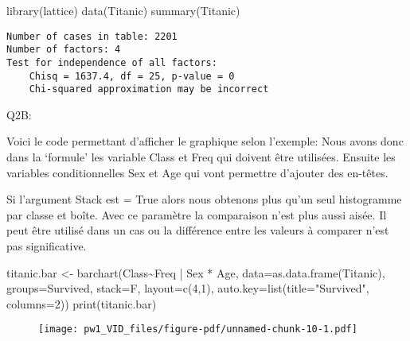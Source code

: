 \documentclass[
  letterpaper,
  DIV=11,
  numbers=noendperiod]{scrartcl}
\newenvironment{Shaded}{}{}
\newcommand{\AttributeTok}[1]{\textcolor[rgb]{0.84,0.23,0.29}{#1}}
\newcommand{\DecValTok}[1]{\textcolor[rgb]{0.00,0.36,0.77}{#1}}
\newcommand{\FunctionTok}[1]{\textcolor[rgb]{0.44,0.26,0.76}{#1}}
\newcommand{\NormalTok}[1]{\textcolor[rgb]{0.14,0.16,0.18}{#1}}
\newcommand{\OtherTok}[1]{\textcolor[rgb]{0.44,0.26,0.76}{#1}}
\newcommand{\SpecialCharTok}[1]{\textcolor[rgb]{0.00,0.36,0.77}{#1}}
\newcommand{\StringTok}[1]{\textcolor[rgb]{0.01,0.18,0.38}{#1}}
\begin{document}
\begin{Shaded}
\begin{Highlighting}[]
\FunctionTok{library}\NormalTok{(lattice)}
\FunctionTok{data}\NormalTok{(Titanic)}
\FunctionTok{summary}\NormalTok{(Titanic)}
\end{Highlighting}
\end{Shaded}

\begin{verbatim}
Number of cases in table: 2201 
Number of factors: 4 
Test for independence of all factors:
    Chisq = 1637.4, df = 25, p-value = 0
    Chi-squared approximation may be incorrect
\end{verbatim}

Q2B:

Voici le code permettant d'afficher le graphique selon l'exemple: Nous
avons donc dans la `formule' les variable Class et Freq qui doivent être
utilisées. Ensuite les variables conditionnelles Sex et Age qui vont
permettre d'ajouter des en-têtes.

Si l'argument Stack est = True alors nous obtenons plus qu'un seul
histogramme par classe et boîte. Avec ce paramètre la comparaison n'est
plus aussi aisée. Il peut être utilisé dans un cas ou la différence
entre les valeurs à comparer n'est pas significative.

\begin{Shaded}
\begin{Highlighting}[]
\NormalTok{titanic.bar }\OtherTok{\textless{}{-}} \FunctionTok{barchart}\NormalTok{(Class}\SpecialCharTok{\textasciitilde{}}\NormalTok{Freq }\SpecialCharTok{|}\NormalTok{ Sex }\SpecialCharTok{*}\NormalTok{ Age, }\AttributeTok{data=}\FunctionTok{as.data.frame}\NormalTok{(Titanic), }
                      \AttributeTok{groups=}\NormalTok{Survived, }\AttributeTok{stack=}\NormalTok{F, }\AttributeTok{layout=}\FunctionTok{c}\NormalTok{(}\DecValTok{4}\NormalTok{,}\DecValTok{1}\NormalTok{), }
                      \AttributeTok{auto.key=}\FunctionTok{list}\NormalTok{(}\AttributeTok{title=}\StringTok{"Survived"}\NormalTok{, }\AttributeTok{columns=}\DecValTok{2}\NormalTok{))}
\FunctionTok{print}\NormalTok{(titanic.bar)}
\end{Highlighting}
\end{Shaded}

\begin{figure}[H]

{\centering \texttt{[image: pw1\_VID\_files/figure-pdf/unnamed-chunk-10-1.pdf]}

}

\end{figure}
\end{document}

